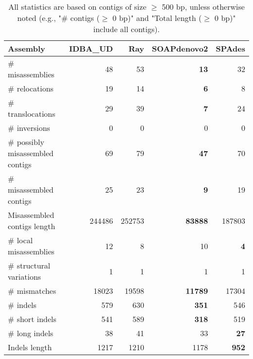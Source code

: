 \documentclass[12pt,a4paper]{article}
\begin{document}
\begin{table}[ht]
\begin{center}
\caption{All statistics are based on contigs of size $\geq$ 500 bp, unless otherwise noted (e.g., "\# contigs ($\geq$ 0 bp)" and "Total length ($\geq$ 0 bp)" include all contigs).}
\begin{tabular}{|l*{4}{|r}|}
\hline
Assembly & IDBA\_UD & Ray & SOAPdenovo2 & SPAdes \\ \hline
\# misassemblies & 48 & 53 & {\bf 13} & 32 \\ \hline
\hspace{5mm}\# relocations & 19 & 14 & {\bf 6} & 8 \\ \hline
\hspace{5mm}\# translocations & 29 & 39 & {\bf 7} & 24 \\ \hline
\hspace{5mm}\# inversions & 0 & 0 & 0 & 0 \\ \hline
\# possibly misassembled contigs & 69 & 79 & {\bf 47} & 70 \\ \hline
\# misassembled contigs & 25 & 23 & {\bf 9} & 19 \\ \hline
Misassembled contigs length & 244486 & 252753 & {\bf 83888} & 187803 \\ \hline
\# local misassemblies & 12 & 8 & 10 & {\bf 4} \\ \hline
\# structural variations & 1 & 1 & 1 & 1 \\ \hline
\# mismatches & 18023 & 19598 & {\bf 11789} & 17304 \\ \hline
\# indels & 579 & 630 & {\bf 351} & 546 \\ \hline
\hspace{5mm}\# short indels & 541 & 589 & {\bf 318} & 519 \\ \hline
\hspace{5mm}\# long indels & 38 & 41 & 33 & {\bf 27} \\ \hline
Indels length & 1217 & 1210 & 1178 & {\bf 952} \\ \hline
\end{tabular}
\end{center}
\end{table}
\end{document}
